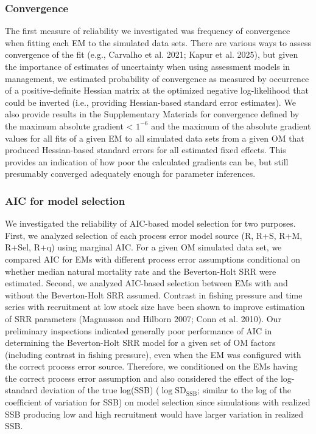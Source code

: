 \documentclass[
  12pt,
]{article}
\begin{document}
\subsubsection*{Convergence}\label{convergence}

The first measure of reliability we investigated was frequency of
convergence when fitting each EM to the simulated data sets. There are
various ways to assess convergence of the fit (e.g., Carvalho et al.
2021; Kapur et al. 2025), but given the importance of estimates of
uncertainty when using assessment models in management, we estimated
probability of convergence as measured by occurrence of a
positive-definite Hessian matrix at the optimized negative
log-likelihood that could be inverted (i.e., providing Hessian-based
standard error estimates). We also provide results in the Supplementary
Materials for convergence defined by the maximum absolute gradient
\textless{} \(1^{-6}\) and the maximum of the absolute gradient values
for all fits of a given EM to all simulated data sets from a given OM
that produced Hessian-based standard errors for all estimated fixed
effects. This provides an indication of how poor the calculated
gradients can be, but still presumably converged adequately enough for
parameter inferences.

\subsubsection*{AIC for model selection}\label{aic-for-model-selection}

We investigated the reliability of AIC-based model selection for two
purposes. First, we analyzed selection of each process error model
source (R, R+S, R+M, R+Sel, R+q) using marginal AIC. For a given OM
simulated data set, we compared AIC for EMs with different process error
assumptions conditional on whether median natural mortality rate and the
Beverton-Holt SRR were estimated. Second, we analyzed AIC-based
selection between EMs with and without the Beverton-Holt SRR assumed.
Contrast in fishing pressure and time series with recruitment at low
stock size have been shown to improve estimation of SRR parameters
(Magnusson and Hilborn 2007; Conn et al. 2010). Our preliminary
inspections indicated generally poor performance of AIC in determining
the Beverton-Holt SRR model for a given set of OM factors (including
contrast in fishing pressure), even when the EM was configured with the
correct process error source. Therefore, we conditioned on the EMs
having the correct process error assumption and also considered the
effect of the log-standard deviation of the true log(SSB)
(\(\log \text{SD}_{\text{SSB}}\); similar to the log of the coefficient
of variation for SSB) on model selection since simulations with realized
SSB producing low and high recruitment would have larger variation in
realized SSB.
\end{document}
